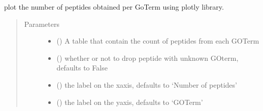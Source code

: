 \documentclass[letterpaper,10pt,english]{sphinxmanual}
\begin{document}
\begin{fulllineitems}
\label{\detokenize{IPTK.Visualization:IPTK.Visualization.vizTools.plotly_num_peptide_per_go_term}}
plot the number of peptides obtained per Go\sphinxhyphen{}Term  using plotly library.
\begin{quote}\begin{description}
\item[{Parameters}] \leavevmode\begin{itemize}
\item {} 
 () \textendash{} A table that contain the count of peptides from each GO\sphinxhyphen{}Term

\item {} 
 (\sphinxstyleliteralemphasis{\sphinxupquote{, }}) \textendash{} whether or not to drop peptide with unknown GO\sphinxhyphen{}term, defaults to False

\item {} 
 (\sphinxstyleliteralemphasis{\sphinxupquote{, }}) \textendash{} the label on the x\sphinxhyphen{}axis, defaults to ‘Number of peptides’

\item {} 
 (\sphinxstyleliteralemphasis{\sphinxupquote{, }}) \textendash{} the label on the y\sphinxhyphen{}axis, defaults to ‘GO\sphinxhyphen{}Term’


\end{itemize}
\end{description}
\end{quote}
\end{fulllineitems}
\end{document}
